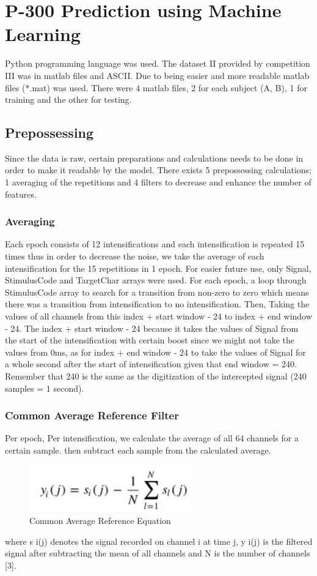 \section{P-300 Prediction using Machine Learning}
Python programming language was used.\newline
The dataset II provided by competition III was in matlab files and ASCII. Due to being easier and more readable matlab files (*.mat) was used. There were 4 matlab files, 2 for each subject (A, B), 1 for training and the other for testing.

\subsection{Prepossessing}
Since the data is raw, certain preparations and calculations needs to be done in order to make it readable by the model. There exists 5 prepossessing calculations; 1 averaging of the repetitions and 4 filters to decrease and enhance the number of features.
\subsubsection{Averaging}
Each epoch consists of 12 intensifications and each intensification is repeated 15 times thus in order to decrease the noise, we take the average of each intensification for the 15 repetitions in 1 epoch.\newline
For easier future use, only Signal, StimulusCode and TargetChar arrays were used. For each epoch, a loop through StimulusCode array to search for a transition from non-zero to zero which means there was a transition from intensification to no intensification. Then, Taking the values of all channels from this index + start window - 24 to index + end window - 24. The index + start window - 24 because it takes the values of Signal from the start of the intensification with certain boost since we might not take the values from 0ms, as for index + end window - 24 to take the values of Signal for a whole second after the start of intensification given that end window = 240. Remember that 240 is the same as the digitization of the intercepted signal (240 samples = 1 second).
\subsubsection{Common Average Reference Filter}
Per epoch, Per intensification, we calculate the average of all 64 channels for a certain sample. then subtract each sample from the calculated average.\newline\newline
\begin{figure}
    \centering
    \includegraphics[width=70mm]{images/CAR-filter.jpg}
    \caption{Common Average Reference Equation}
    \label{fig:my_label}
\end{figure}
where s i(j) denotes the signal recorded on channel i at time j, y i(j) is the filtered signal after subtracting the mean of all channels and N is the number of channels [3].

